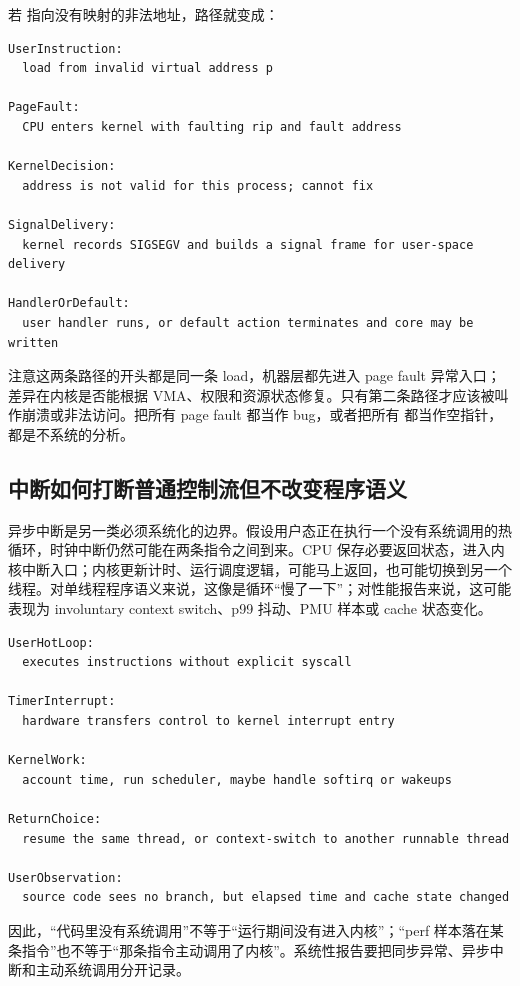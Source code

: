 若  指向没有映射的非法地址，路径就变成：

\begin{lstlisting}[numbers=none,caption={无法修复的 fault 转成 signal}]
UserInstruction:
  load from invalid virtual address p

PageFault:
  CPU enters kernel with faulting rip and fault address

KernelDecision:
  address is not valid for this process; cannot fix

SignalDelivery:
  kernel records SIGSEGV and builds a signal frame for user-space delivery

HandlerOrDefault:
  user handler runs, or default action terminates and core may be written
\end{lstlisting}

注意这两条路径的开头都是同一条 load，机器层都先进入 page fault 异常入口；差异在内核是否能根据 VMA、权限和资源状态修复。只有第二条路径才应该被叫作崩溃或非法访问。把所有 page fault 都当作 bug，或者把所有  都当作空指针，都是不系统的分析。

\subsection{中断如何打断普通控制流但不改变程序语义}

异步中断是另一类必须系统化的边界。假设用户态正在执行一个没有系统调用的热循环，时钟中断仍然可能在两条指令之间到来。CPU 保存必要返回状态，进入内核中断入口；内核更新计时、运行调度逻辑，可能马上返回，也可能切换到另一个线程。对单线程程序语义来说，这像是循环“慢了一下”；对性能报告来说，这可能表现为 involuntary context switch、p99 抖动、PMU 样本或 cache 状态变化。

\begin{lstlisting}[numbers=none,caption={异步中断的普通控制流视角}]
UserHotLoop:
  executes instructions without explicit syscall

TimerInterrupt:
  hardware transfers control to kernel interrupt entry

KernelWork:
  account time, run scheduler, maybe handle softirq or wakeups

ReturnChoice:
  resume the same thread, or context-switch to another runnable thread

UserObservation:
  source code sees no branch, but elapsed time and cache state changed
\end{lstlisting}

因此，“代码里没有系统调用”不等于“运行期间没有进入内核”；“perf 样本落在某条指令”也不等于“那条指令主动调用了内核”。系统性报告要把同步异常、异步中断和主动系统调用分开记录。

